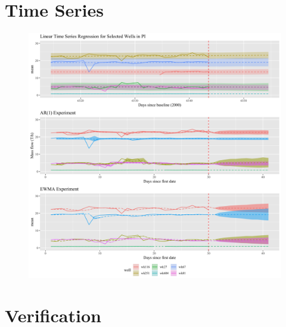 \documentclass[a4paper, 12pt]{article}
\begin{document}
\newpage
\begin{appendices}
\section{Time Series}

\begin{figure}[h]
  \centering
  \includegraphics[width=\linewidth]{media/ts_experiment}
  \label{fig:ts_experiment}
\end{figure}

\newpage
\section{Verification}


\end{appendices}
\end{document}
